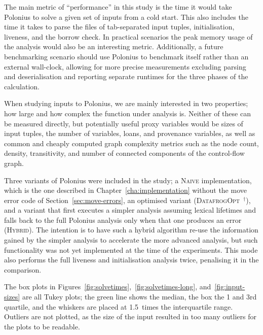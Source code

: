 \documentclass[11pt,a4paper,twoside,openany,draft]{report}
\newcommand{\notmine}[0] {$^\dagger$}
\begin{document}
The main metric of ``performance'' in this study is the time it would take
Polonius to solve a given set of inputs from a cold start. This also includes
the time it takes to parse the files of tab-separated input tuples,
initialisation, liveness, and the borrow check. In practical scenarios the peak
memory usage of the analysis would also be an interesting metric. Additionally,
a future benchmarking scenario should use Polonius to benchmark itself rather
than an external wall-clock, allowing for more precise measurements excluding
parsing and deserialisation and reporting separate runtimes for the three
phases of the calculation.

When studying inputs to Polonius, we are mainly interested in two properties;
how large and how complex the function under analysis is. Neither of these can
be measured directly, but potentially useful proxy variables would be sizes of
input tuples, the number of variables, loans, and provenance variables, as well
as common and cheaply computed graph complexity metrics such as the node count,
density, transitivity, and number of connected components of the control-flow
graph.

Three variants of Polonius were included in the study; a \textsc{Naive}
implementation, which is the one described in Chapter~\ref{cha:implementation}
without the move error code of Section~\ref{sec:move-errors}, an optimised
variant (\textsc{DatafrogOpt}~\notmine{}), and a variant that first executes a
simpler analysis assuming lexical lifetimes and falls back to the full Polonius
analysis only when that one produces an error (\textsc{Hybrid}). The intention
is to have such a hybrid algorithm re-use the information gained by the simpler
analysis to accelerate the more advanced analysis, but such functionality was
not yet implemented at the time of the experiments. This mode also performs the
full liveness and initialisation analysis twice, penalising it in the
comparison.

The box plots in Figures~\ref{fig:solvetimes},~\ref{fig:solvetimes-long},
and~\ref{fig:input-sizes} are all Tukey plots; the green line shows the median,
the box the 1 and 3rd quartile, and the whiskers are placed at 1.5~times the
interquartile range. Outliers are not plotted, as the size of the input resulted
in too many outliers for the plots to be readable.
\end{document}
